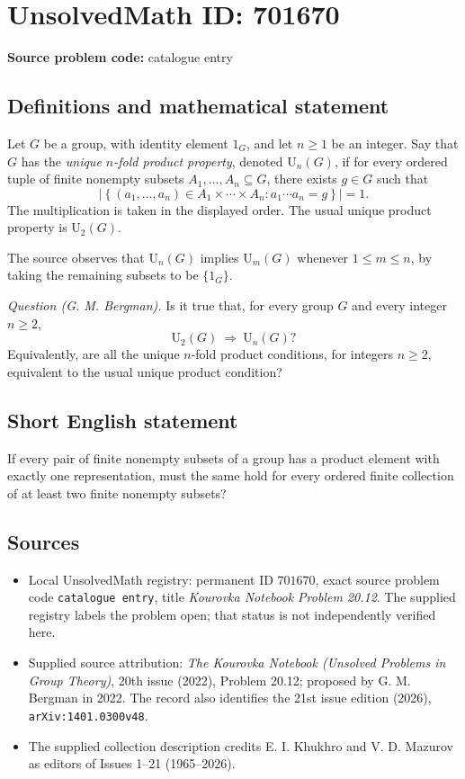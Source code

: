 \documentclass[11pt]{article}
\begin{document}
\section*{UnsolvedMath ID: 701670}
\textbf{Source problem code:} catalogue entry
\subsection{Definitions and mathematical statement}
Let \(G\) be a group, with identity element \(1_G\), and let \(n\geq 1\) be an integer. Say that \(G\) has the \emph{unique \(n\)-fold product property}, denoted \(\mathrm{U}_n(G)\), if for every ordered tuple of finite nonempty subsets \(A_1,\ldots,A_n\subseteq G\), there exists \(g\in G\) such that
\[
\left|\left\{(a_1,\ldots,a_n)\in A_1\times\cdots\times A_n : a_1\cdots a_n=g\right\}\right|=1.
\]
The multiplication is taken in the displayed order. The usual unique product property is \(\mathrm{U}_2(G)\).

The source observes that \(\mathrm{U}_n(G)\) implies \(\mathrm{U}_m(G)\) whenever \(1\leq m\leq n\), by taking the remaining subsets to be \(\{1_G\}\).

\emph{Question (G. M. Bergman).} Is it true that, for every group \(G\) and every integer \(n\geq 2\),
\[
\mathrm{U}_2(G)\ \Longrightarrow\ \mathrm{U}_n(G)?
\]
Equivalently, are all the unique \(n\)-fold product conditions, for integers \(n\geq 2\), equivalent to the usual unique product condition?
\subsection{Short English statement}
If every pair of finite nonempty subsets of a group has a product element with exactly one representation, must the same hold for every ordered finite collection of at least two finite nonempty subsets?
\subsection{Sources}
\begin{itemize}
\item Local UnsolvedMath registry: permanent ID \(701670\), exact source problem code \texttt{catalogue entry}, title \emph{Kourovka Notebook Problem 20.12}. The supplied registry labels the problem open; that status is not independently verified here.
\item Supplied source attribution: \emph{The Kourovka Notebook (Unsolved Problems in Group Theory)}, 20th issue (2022), Problem 20.12; proposed by G. M. Bergman in 2022. The record also identifies the 21st issue edition (2026), \texttt{arXiv:1401.0300v48}.
\item The supplied collection description credits E. I. Khukhro and V. D. Mazurov as editors of Issues 1--21 (1965--2026).
\end{itemize}
\end{document}
